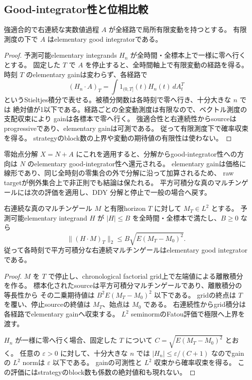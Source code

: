 \subsection{Good-integrator性と位相比較}
\label{sec:emery-completeness}
\begin{lemma}
強適合的で右連続な実数値過程 $A$ が全経路で局所有限変動を持つとする。
有限測度の下で $A$ はelementary good integratorである。
\end{lemma}
\begin{proof}
予測可能elementary integrands $H_n$ が全時間・全標本上で一様に零へ行くとする。
固定した $T$ で $A$ を停止すると、全時間軸上で有限変動の経路を得る。
時刻 $T$ のelementary gainは変わらず、各経路で
\[
 (H_n\mathbin{\cdot}A)_T
 =\int 1_{(0,T]}(t)H_n(t)\,dA^T_t
\]
というStieltjes積分で表せる。被積分関数は各時刻で零へ行き、十分大きな $n$ では
絶対値が1以下である。経路ごとの全変動測度は有限なので、ベクトル測度の支配収束により
gainは各標本で零へ行く。
強適合性と右連続性からsourceはprogressiveであり、elementary gainは可測である。
従って有限測度下で確率収束を得る。
strategyのblock数の上界や変動の期待値の有限性は使わない。
\end{proof}

零始点分解 $X=N+A$ にこれを適用すると、分解からgood-integrator性への方向は
$N$ のelementary good-integrator性へ還元される。
elementary gainは価格に線形であり、同じ全時刻の零集合の外で分解に沿って加算されるため、
raw targetが例外集合上で非正則でも結論は保たれる。
平方可積分な真のマルチンゲールには次の評価を適用し、DDY 分解と停止で一般の場合へ戻す。

\begin{lemma}
右連続な真のマルチンゲール $M$ と有限horizon $T$ に対して $M_T\in L^2$ とする。
予測可能elementary integrand $H$ が $|H|\le B$ を全時間・全標本で満たし、$B\ge0$ なら
\[
 \|(H\mathbin{\cdot}M)_T\|_2
 \le B\sqrt{E(M_T-M_0)^2}.
\]
従って各時刻で平方可積分な右連続マルチンゲールはelementary good integratorである。
\end{lemma}
\begin{proof}
$M$ を $T$ で停止し、chronological factorial grid上で左端値による離散積分を作る。
標本化されたsourceは平方可積分マルチンゲールであり、離散積分の等長性から
その二乗期待値は $B^2E(M_T-M_0)^2$ 以下である。
gridの終点は $T$ を覆い、停止sourceの終値は $M_T$、始点は $M_0$ である。
右連続性からgrid積分は各経路でelementary gainへ収束する。
$L^2$ seminormのFatou評価で極限へ上界を渡す。

$H_n$ が一様に零へ行く場合、固定した $T$ について
$C=\sqrt{E(M_T-M_0)^2}$ とおく。
任意の $\varepsilon>0$ に対して、十分大きな $n$ では
$|H_n|\le\varepsilon/(C+1)$ なのでgainの $L^2$ normは $\varepsilon$ 以下である。
gainの可測性と $L^2$ 収束から確率収束を得る。
この評価にはstrategyのblock数も係数の絶対値和も現れない。
\end{proof}

